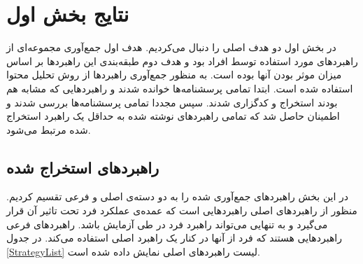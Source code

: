 \documentclass[twoside, a4paper,11pt]{book}
\numberwithin{equation}{chapter}
\numberwithin{table}{chapter}
\numberwithin{figure}{chapter}
\numberwithin{equation}{chapter}
\begin{document}
\section{نتایج بخش اول}
در بخش اول دو هدف اصلی را دنبال می‌کردیم. هدف اول جمع‌آوری مجموعه‌ای از راهبرد‌های مورد استفاده توسط افراد بود و هدف دوم طبقه‌بندی این راهبرد‌ها بر اساس میزان موثر بودن آنها بوده است. به منظور جمع‌آوری راهبردها از روش تحلیل محتوا استفاده شده است.  ابتدا تمامی پرسشنامه‌ها خوانده شدند و راهبردهایی که مشابه هم بودند استخراج و کدگزاری شدند. سپس مجددا تمامی پرسشنامه‌ها بررسی شدند و اطمینان حاصل شد که تمامی راهبرد‌های نوشته شده به حداقل یک راهبرد استخراج شده مرتبط می‌شود.

\subsection{راهبرد‌های استخراج شده}
در این بخش راهبرد‌های جمع‌آوری شده را  به دو دسته‌ی اصلی و فرعی تقسیم  کردیم. منظور از راهبردهای اصلی راهبرد‌هایی است که عمده‌ی عملکرد فرد تحت تاثیر آن قرار می‌گیرد و به تنهایی می‌تواند راهبرد فرد در طی آزمایش باشد. راهبردهای فرعی راهبردهایی هستند که فرد از آنها در کنار یک راهبرد اصلی استفاده می‌کند. در جدول \ref{StrategyList} لیست راهبرد‌های اصلی نمایش داده شده است.
\end{document}
